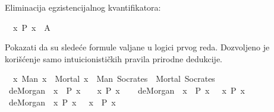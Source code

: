 \begin{isabellebody}
\begin{exercise}[subtitle=Intuicionistička pravila prirodne dedukcije u logici prvog reda]
\begin{isamarkuptext}
Eliminacija egzistencijalnog kvantifikatora: %
\end{isamarkuptext}\isamarkuptrue%
\isamarkupfalse%
\ {\isachardoublequoteopen}{\isasymexists}\ x{\isachardot}{\kern0pt}\ P\ x\ {\isasymLongrightarrow}\ A{\isachardoublequoteclose}\isanewline
\ \ %
\isadelimproof
%
\endisadelimproof
%
\isatagproof
%
\endisatagproof
{\isafoldproof}%
%
\isadelimproof
%
\endisadelimproof
%
\end{exercise}
%
\begin{exercise}[subtitle=Dokazi u prirodnoj dedukciji]
%
\begin{isamarkuptext}%
Pokazati da su sledeće formule valjane u logici prvog reda. 
      Dozvoljeno je korišćenje samo intuicionističkih pravila prirodne dedukcije.%
\end{isamarkuptext}\isamarkuptrue%
\isamarkupfalse%
\ {\isachardoublequoteopen}{\isacharparenleft}{\kern0pt}{\isasymforall}\ x{\isachardot}{\kern0pt}\ Man\ x\ {\isasymlongrightarrow}\ Mortal\ x{\isacharparenright}{\kern0pt}\ {\isasymand}\ Man\ Socrates\ {\isasymlongrightarrow}\ Mortal\ Socrates{\isachardoublequoteclose}\isanewline
\ \ %
\isadelimproof
%
\endisadelimproof
%
\isatagproof
%
\endisatagproof
{\isafoldproof}%
%
\isadelimproof
%
\endisadelimproof
\isanewline
{}\isamarkupfalse%
\ de{\isacharunderscore}{\kern0pt}Morgan{\isacharunderscore}{\kern0pt}{}{\isacharcolon}{\kern0pt}\ {\isachardoublequoteopen}{\isacharparenleft}{\kern0pt}{\isasymexists}\ x{\isachardot}{\kern0pt}\ {\isasymnot}\ P\ x{\isacharparenright}{\kern0pt}\ {\isasymlongrightarrow}\ {\isasymnot}\ {\isacharparenleft}{\kern0pt}{\isasymforall}\ x{\isachardot}{\kern0pt}\ P\ x{\isacharparenright}{\kern0pt}{\isachardoublequoteclose}\isanewline
\ \ %
\isadelimproof
%
\endisadelimproof
%
\isatagproof
%
\endisatagproof
{\isafoldproof}%
%
\isadelimproof
%
\endisadelimproof
\isanewline
{}\isamarkupfalse%
\ de{\isacharunderscore}{\kern0pt}Morgan{\isacharunderscore}{\kern0pt}{}{\isacharcolon}{\kern0pt}\ {\isachardoublequoteopen}{\isacharparenleft}{\kern0pt}{\isasymforall}\ x{\isachardot}{\kern0pt}\ {\isasymnot}\ P\ x{\isacharparenright}{\kern0pt}\ {\isasymlongrightarrow}\ {\isacharparenleft}{\kern0pt}{\isasymnexists}\ x{\isachardot}{\kern0pt}\ P\ x{\isacharparenright}{\kern0pt}{\isachardoublequoteclose}\isanewline
\ \ %
\isadelimproof
%
\endisadelimproof
%
\isatagproof
%
\endisatagproof
{\isafoldproof}%
%
\isadelimproof
%
\endisadelimproof
\isanewline
{}\isamarkupfalse%
\ de{\isacharunderscore}{\kern0pt}Morgan{\isacharunderscore}{\kern0pt}{}{\isacharcolon}{\kern0pt}\ {\isachardoublequoteopen}{\isacharparenleft}{\kern0pt}{\isasymnexists}\ x{\isachardot}{\kern0pt}\ P\ x{\isacharparenright}{\kern0pt}\ {\isasymlongrightarrow}\ {\isacharparenleft}{\kern0pt}{\isasymforall}\ x{\isachardot}{\kern0pt}\ {\isasymnot}\ P\ x{\isacharparenright}{\kern0pt}{\isachardoublequoteclose}\isanewline

\end{exercise}
\end{isabellebody}
